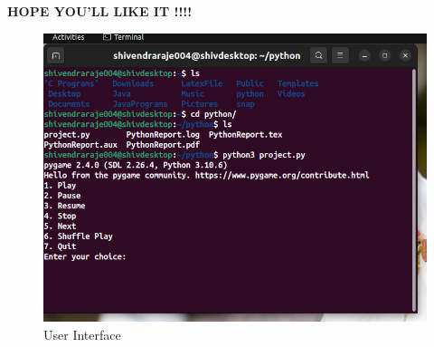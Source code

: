 \documentclass{article}
\begin{document}
\begin{center}\textbf{HOPE YOU'LL LIKE IT !!!!}\end{center}
\begin{figure}[h]
		\includegraphics[width=\linewidth]{Interface.png}
		\caption{User Interface}
		\label{Interface}
	\end{figure}
\end{document}
